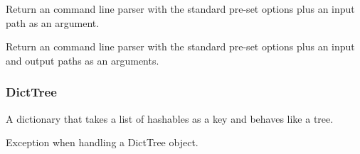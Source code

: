 \documentclass[letterpaper,10pt,english]{sphinxmanual}
\begin{document}

\begin{fulllineitems}
\label{\detokenize{ref/util/CmnCmdOpts:TotalDepth.util.CmnCmdOpts.argParserIn}}
Return an command line parser with the standard pre-set options plus an input path as an argument.

\end{fulllineitems}


\begin{fulllineitems}
\label{\detokenize{ref/util/CmnCmdOpts:TotalDepth.util.CmnCmdOpts.argParserInOut}}
Return an command line parser with the standard pre-set options plus an input and output paths as an arguments.

\end{fulllineitems}



\subsubsection{DictTree}
\label{\detokenize{ref/util/DictTree::doc}}\label{\detokenize{ref/util/DictTree:module-TotalDepth.util.DictTree}}\label{\detokenize{ref/util/DictTree:dicttree}}
A dictionary that takes a list of hashables as a key and behaves like a tree.

\begin{fulllineitems}
\label{\detokenize{ref/util/DictTree:TotalDepth.util.DictTree.ExceptionDictTree}}
Exception when handling a DictTree object.

\end{fulllineitems}

\end{document}
